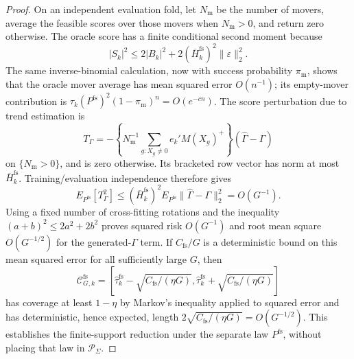 \documentclass{article}
\begin{document}
\begin{proof}
On an independent evaluation fold, let \(N_{\mathrm m}\) be the number of movers, average the feasible scores over those movers when \(N_{\mathrm m}>0\), and return zero otherwise.  The oracle score has a finite conditional second moment because
\[
|S_k|^2
\le 2|B_k|^2+2(\overline H_k^{\mathrm{fs}})^2\lVert\varepsilon\rVert_2^2.
\]
The same inverse-binomial calculation, now with success probability \(\pi_{\mathrm m}\), shows that the oracle mover average has mean squared error \(O(n^{-1})\); its empty-mover contribution is \(\tau_k(P^{\mathrm{fs}})^2(1-\pi_{\mathrm m})^n=O(e^{-cn})\).  The score perturbation due to trend estimation is
\[
T_\Gamma=-\left\{N_{\mathrm m}^{-1}
\sum_{g:X_g\ne0}e_k'M(X_g)^+\right\}(\widehat\Gamma-\Gamma)
\]
on \(\{N_{\mathrm m}>0\}\), and is zero otherwise.  Its bracketed row vector has norm at most \(\overline H_k^{\mathrm{fs}}\).  Training/evaluation independence therefore gives
\[
E_{P^{\mathrm{fs}}}[T_\Gamma^2]
\le (\overline H_k^{\mathrm{fs}})^2
E_{P^{\mathrm{fs}}}\lVert\widehat\Gamma-\Gamma\rVert_2^2
=O(G^{-1}).
\]
Using a fixed number of cross-fitting rotations and the inequality \((a+b)^2\le2a^2+2b^2\) proves squared risk \(O(G^{-1})\) and root mean square \(O(G^{-1/2})\) for the generated-\(\Gamma\) term.  If \(C_{\mathrm{fs}}/G\) is a deterministic bound on this mean squared error for all sufficiently large \(G\), then
\[
\mathcal C_{G,k}^{\mathrm{fs}}
=\left[
\widehat\tau_k^{\mathrm{fs}}-\sqrt{C_{\mathrm{fs}}/(\eta G)},
\widehat\tau_k^{\mathrm{fs}}+\sqrt{C_{\mathrm{fs}}/(\eta G)}
\right]
\]
has coverage at least \(1-\eta\) by Markov's inequality applied to squared error and has deterministic, hence expected, length \(2\sqrt{C_{\mathrm{fs}}/(\eta G)}=O(G^{-1/2})\).  This establishes the finite-support reduction under the separate law \(P^{\mathrm{fs}}\), without placing that law in \(\mathcal P_\Sigma\).


\end{proof}
\end{document}
